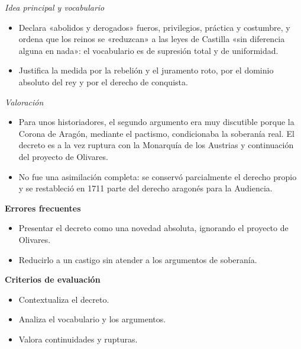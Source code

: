 \documentclass{book}
\begin{document}
\begin{tcolorbox}[title={Ejercicio resuelto}, studiumworked, breakable]
\noindent\textit{Idea principal y vocabulario}
\begin{itemize}
\item Declara «abolidos y derogados» fueros, privilegios, práctica y costumbre, y ordena que los reinos se «reduzcan» a las leyes de Castilla «sin diferencia alguna en nada»: el vocabulario es de supresión total y de uniformidad.
\item Justifica la medida por la rebelión y el juramento roto, por el dominio absoluto del rey y por el derecho de conquista.
\end{itemize}

\noindent\textit{Valoración}
\begin{itemize}
\item Para unos historiadores, el segundo argumento era muy discutible porque la Corona de Aragón, mediante el pactismo, condicionaba la soberanía real. El decreto es a la vez ruptura con la Monarquía de los Austrias y continuación del proyecto de Olivares.
\item No fue una asimilación completa: se conservó parcialmente el derecho propio y se restableció en 1711 parte del derecho aragonés para la Audiencia.
\end{itemize}

\noindent\textbf{Errores frecuentes}
\begin{itemize}
\item Presentar el decreto como una novedad absoluta, ignorando el proyecto de Olivares.
\item Reducirlo a un castigo sin atender a los argumentos de soberanía.
\end{itemize}

\noindent\textbf{Criterios de evaluación}
\begin{itemize}
\item Contextualiza el decreto.
\item Analiza el vocabulario y los argumentos.
\item Valora continuidades y rupturas.
\end{itemize}
\end{tcolorbox}
\end{document}
